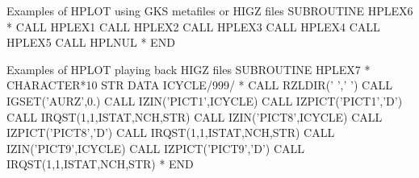 \newpage

\begin{XMPt}{Examples of HPLOT using GKS metafiles or HIGZ files}
      SUBROUTINE HPLEX6
*
      CALL HPLEX1
      CALL HPLEX2
      CALL HPLEX3
      CALL HPLEX4
      CALL HPLEX5
      CALL HPLNUL
*
      END
\end{XMPt}

\begin{XMPt}{Examples of HPLOT playing back HIGZ files}
      SUBROUTINE HPLEX7
*
      CHARACTER*10 STR
      DATA ICYCLE/999/
*
      CALL RZLDIR(' ',' ')
      CALL IGSET('AURZ',0.)
      CALL IZIN('PICT1',ICYCLE)
      CALL IZPICT('PICT1','D')
      CALL IRQST(1,1,ISTAT,NCH,STR)
      CALL IZIN('PICT8',ICYCLE)
      CALL IZPICT('PICT8','D')
      CALL IRQST(1,1,ISTAT,NCH,STR)
      CALL IZIN('PICT9',ICYCLE)
      CALL IZPICT('PICT9','D')
      CALL IRQST(1,1,ISTAT,NCH,STR)
*
      END
\end{XMPt}
